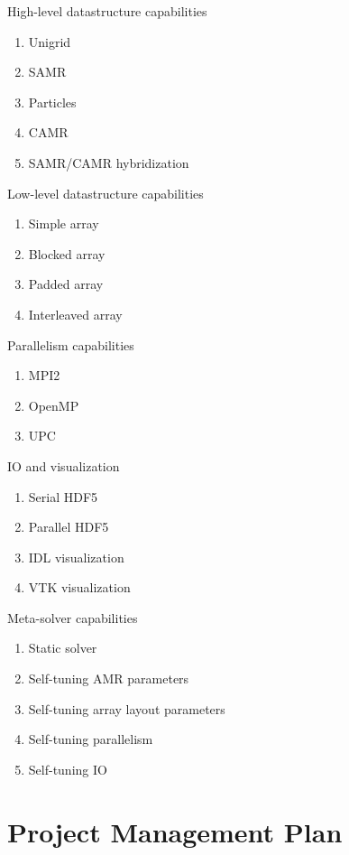 \documentclass{article}[12pt]
\begin{document}
High-level datastructure capabilities

\begin{enumerate}
\item Unigrid
\item SAMR
\item Particles
\item CAMR
\item SAMR/CAMR hybridization
\end{enumerate}

Low-level  datastructure capabilities

\begin{enumerate}
\item Simple array
\item Blocked array
\item Padded array
\item Interleaved array
\end{enumerate}

Parallelism capabilities

\begin{enumerate}
\item MPI2
\item OpenMP
\item UPC
\end{enumerate}

IO and visualization

\begin{enumerate}
\item Serial HDF5
\item Parallel HDF5
\item IDL visualization
\item VTK visualization
\end{enumerate}

Meta-solver capabilities

\begin{enumerate}
\item Static solver
\item Self-tuning AMR parameters
\item Self-tuning array layout parameters
\item Self-tuning parallelism
\item Self-tuning IO
\end{enumerate}


\section{Project Management Plan} \label{s:intro}
\end{document}

